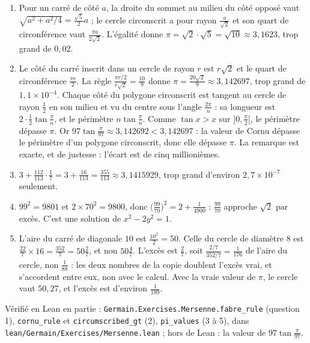 \documentclass[11pt,a4paper]{article}
\begin{document}
\begin{solution}
\begin{enumerate}
\item Pour un carré de côté $a$, la droite du sommet au milieu du côté opposé vaut
  $\sqrt{a^2 + a^2/4} = \frac{\sqrt5}{2}a$ ; le cercle circonscrit a pour rayon
  $\frac{a}{\sqrt2}$ et son quart de circonférence vaut $\frac{\pi a}{2\sqrt2}$.
  L'égalité donne $\pi = \sqrt2\cdot\sqrt5 = \sqrt{10} \approx 3{,}1623$, trop
  grand de $0{,}02$.
\item Le côté du carré inscrit dans un cercle de rayon $r$ est $r\sqrt2$ et le
  quart de circonférence $\frac{\pi r}{2}$. La règle $\frac{\pi r/2}{r\sqrt2} =
  \frac{10}{9}$ donne $\pi = \frac{20\sqrt2}{9} \approx 3{,}142697$, trop grand de
  $1{,}1\times 10^{-4}$. Chaque côté du polygone circonscrit est tangent au cercle
  de rayon $\frac12$ en son milieu et vu du centre sous l'angle $\frac{2\pi}{n}$ :
  sa longueur est $2\cdot\frac12\tan\frac{\pi}{n}$, et le périmètre
  $n\tan\frac{\pi}{n}$. Comme $\tan x > x$ sur $]0, \frac{\pi}{2}[$, le périmètre
  dépasse $\pi$. Or $97\tan\frac{\pi}{97} \approx 3{,}142692 < 3{,}142697$ : la
  valeur de Cornu dépasse le périmètre d'un polygone circonscrit, donc elle
  dépasse $\pi$. La remarque est exacte, et de justesse : l'écart est de cinq
  millionièmes.
\item $3 + \frac{112}{113}\cdot\frac17 = 3 + \frac{16}{113} = \frac{355}{113}
  \approx 3{,}1415929$, trop grand d'environ $2{,}7\times 10^{-7}$ seulement.
\item $99^2 = 9801$ et $2\times 70^2 = 9800$, donc $\bigl(\frac{99}{70}\bigr)^2 =
  2 + \frac{1}{4900}$ : $\frac{99}{70}$ approche $\sqrt2$ par excès. C'est une
  solution de $x^2 - 2y^2 = 1$.
\item L'aire du carré de diagonale $10$ est $\frac{10^2}{2} = 50$. Celle du cercle
  de diamètre $8$ est $\frac{22}{7}\times 16 = \frac{352}{7} = 50\frac27$, et non
  $50\frac47$. L'excès est $\frac27$, soit $\frac{2/7}{352/7} = \frac{1}{176}$ de
  l'aire du cercle, non $\frac{1}{88}$ : les deux nombres de la copie doublent
  l'excès vrai, et s'accordent entre eux, non avec le calcul. Avec la vraie
  valeur de $\pi$, le cercle vaut $50{,}27$, et l'excès est d'environ
  $\frac{1}{189}$.
\end{enumerate}

Vérifié en Lean en partie : \texttt{Germain.Exercises.Mersenne.fabre\_rule} (question 1),
\texttt{cornu\_rule} et \texttt{circumscribed\_gt} (2), \texttt{pi\_values} (3 à 5), dans
\texttt{lean/Germain/Exercises/Mersenne.lean} ; hors de Lean : la valeur de $97\tan\frac{\pi}{97}$.
\end{solution}
\end{document}
